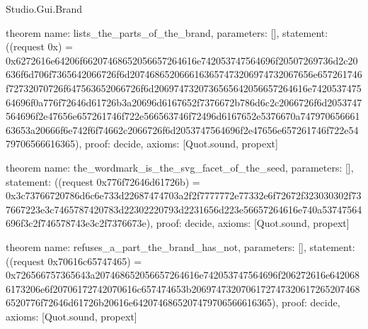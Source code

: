 \begin{lexlean}{Studio.Gui.Brand}
\begin{semanticmodule}
theorem{
  name: lists_the_parts_of_the_brand,
  parameters: [],
  statement: ((request 0x) = 0x6272616e64206f66207468652056657264616e742053747564696f20507269736d2c20636f6d706f7365642066726f6d2074686520666163657473206974732067656e657261746f72732070726f647563652066726f6d2069747320736565642056657264616e742053747564696f0a776f72646d61726b3a20696d6167652f7376672b786d6c2c2066726f6d2053747564696f2e47656e657261746f722e566563746f72496d6167652e5376670a74797065666163653a20666f6e742f6f74662c2066726f6d2053747564696f2e47656e657261746f722e5479706566616365),
  proof: decide{},
  axioms: [Quot.sound, propext]
}

theorem{
  name: the_wordmark_is_the_svg_facet_of_the_seed,
  parameters: [],
  statement: ((request 0x776f72646d61726b) = 0x3c73766720786d6c6e733d22687474703a2f2f7777772e77332e6f72672f323030302f737667223e3c7465787420783d22302220793d2231656d223e56657264616e740a53747564696f3c2f746578743e3c2f7376673e),
  proof: decide{},
  axioms: [Quot.sound, propext]
}

theorem{
  name: refuses_a_part_the_brand_has_not,
  parameters: [],
  statement: ((request 0x70616c65747465) = 0x726566757365643a207468652056657264616e742053747564696f206272616e6420686173206e6f20706172742070616c657474653b20697473207061727473206172652074686520776f72646d61726b20616e6420746865207479706566616365),
  proof: decide{},
  axioms: [Quot.sound, propext]
}
\end{semanticmodule}
\end{lexlean}
